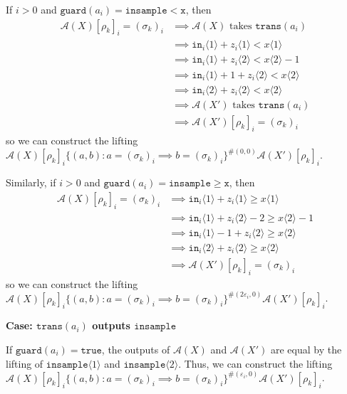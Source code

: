 \documentclass[12pt]{article}
\newcommand{\gguard}[1][x]{\texttt{insample}\geq \texttt{#1}}
\newcommand{\lguard}[1][x]{\texttt{insample} < \texttt{#1}}
\newcommand{\brangle}[1]{\langle #1 \rangle}
\newcommand{\guard}{\texttt{guard}}
\newcommand{\trans}{\texttt{trans}}
\theoremstyle{definition}
\begin{document}
If $i > 0$ and $\guard(a_i) = \lguard$, then \begin{align*}
	\mathcal{A}(X)[\rho_k]_i = (\sigma_k)_i&\implies \mathcal{A}(X)\text{ takes }\trans(a_i)\\
	&\implies \texttt{in}_i\langle 1 \rangle + z_i\langle 1 \rangle < x\langle 1 \rangle\\
	&\implies \texttt{in}_i\langle 1\rangle + z_i\langle 2 \rangle < x\langle 2 \rangle-1\\
	&\implies\texttt{in}_i\langle 1 \rangle +1 + z_i\langle 2 \rangle < x\langle 2 \rangle\\
	&\implies\texttt{in}_i\langle 2 \rangle + z_i\langle 2 \rangle < x\langle 2 \rangle\\
	&\implies \mathcal{A}(X')\text{ takes }\trans(a_i)\\
	&\implies \mathcal{A}(X')[\rho_k]_i = (\sigma_k)_i
\end{align*}
so we can construct the lifting $\mathcal{A}(X)[\rho_k]_i\{(a, b): a = (\sigma_k)_i \implies b = (\sigma_k)_i\}^{\#(0, 0)}\mathcal{A}(X')[\rho_k]_i$.

Similarly, if $i>0$ and $\guard(a_i) = \gguard$, then \begin{align*}
	\mathcal{A}(X)[\rho_k]_i = (\sigma_k)_i&\implies \texttt{in}_i\langle 1 \rangle + z_i\langle 1 \rangle \geq x\langle 1 \rangle\\
	&\implies \texttt{in}_i\langle 1\rangle + z_i\langle 2 \rangle -2 \geq x\langle 2 \rangle-1\\
	&\implies\texttt{in}_i\langle 1 \rangle -1 + z_i\langle 2 \rangle \geq x\langle 2 \rangle\\
	&\implies\texttt{in}_i\langle 2 \rangle + z_i\langle 2 \rangle \geq x\langle 2 \rangle\\
	&\implies \mathcal{A}(X')[\rho_k]_i = (\sigma_k)_i
\end{align*}
so we can construct the lifting $\mathcal{A}(X)[\rho_k]_i\{(a, b): a = (\sigma_k)_i \implies b = (\sigma_k)_i\}^{\#(2\varepsilon_i, 0)}\mathcal{A}(X')[\rho_k]_i$.


\textbf{Case: $\trans(a_i)$ outputs $\texttt{insample}$}

If $\guard(a_i) = \texttt{true}$, the outputs of $\mathcal{A}(X)$ and $\mathcal{A}(X')$ are equal by the lifting of $\texttt{insample}\brangle{1}$ and $\texttt{insample}\brangle{2}$. Thus, we can construct the lifting  $\mathcal{A}(X)[\rho_k]_i\{(a, b): a = (\sigma_k)_i \implies b = (\sigma_k)_i\}^{\#(\varepsilon_i, 0)}\mathcal{A}(X')[\rho_k]_i$.
\end{document}
